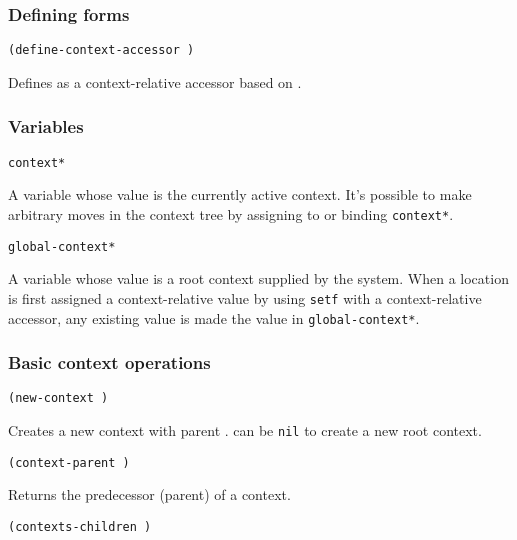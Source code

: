 \subsubsection{Defining forms}

\begin{tabbing}
{\tt (define-context-accessor  )}
\end{tabbing}

Defines  as a context-relative accessor based on 
.


\subsubsection{Variables}

\begin{tabbing}
{\tt *context*}
\end{tabbing}

A variable whose value is the currently active context.  It's
possible to make arbitrary moves in the context tree by assigning
to or binding {\tt *context*}.

\begin{tabbing}
{\tt *global-context*}
\end{tabbing}

A variable whose value is a root context supplied by the system.  
When a location is first assigned a context-relative value by using
{\tt setf} with a context-relative accessor, any existing value is
made the value in {\tt *global-context*}.


\subsubsection{Basic context operations}

\begin{tabbing}
{\tt (new-context )} \MapsTo {}
\end{tabbing}

Creates a new context with parent .   can be
{\tt nil} to create a new root context.

\begin{tabbing}
{\tt (context-parent )} \MapsTo {}
\end{tabbing}

Returns the predecessor (parent) of a context.

\begin{tabbing}
{\tt (contexts-children )} \MapsTo {}
\end{tabbing}

